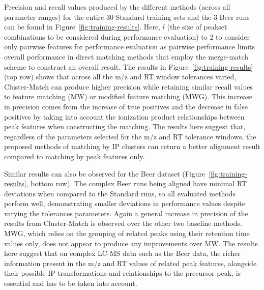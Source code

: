 Precision and recall values produced by the different methods (across all parameter ranges) for the entire 30 Standard training sets and the 3 Beer runs can be found in Figure~\ref{fig:training-results}. Here, $l$ (the size of peakset combinations to be considered during performance evaluation) to 2 to consider only pairwise features for performance evaluation as pairwise performance limits overall performance in direct matching methods that employ the merge-match scheme to construct an overall result. The results in Figure~\ref{fig:training-results} (top row) shows that across all the m/z and RT window tolerances varied, Cluster-Match can produce higher precision while retaining similar recall values to feature matching (MW) or modified feature matching (MWG). This increase in precision comes from the increase of true positives and the decrease in false positives by taking into account the ionization product relationships between peak features when constructing the matching. The results here suggest that, regardless of the parameters selected for the m/z and RT tolerance windows, the proposed methods of matching by IP clusters can return a better alignment result compared to matching by peak features only.

Similar results can also be observed for the Beer dataset (Figure~\ref{fig:training-results}, bottom row). The complex Beer runs being aligned have minimal RT deviations when compared to the Standard runs, so all evaluated methods perform well, demonstrating smaller deviations in performance values despite varying the tolerances parameters. Again a general increase in precision of the results from Cluster-Match is observed over the other two baseline methods. MWG, which relies on the grouping of related peaks using their retention time values only, does not appear to produce any improvements over MW. The results here suggest that on complex LC-MS data such as the Beer data, the richer information present in the m/z and RT values of related peak features, alongside their possible IP transformations and relationships to the precursor peak, is essential and has to be taken into account.

